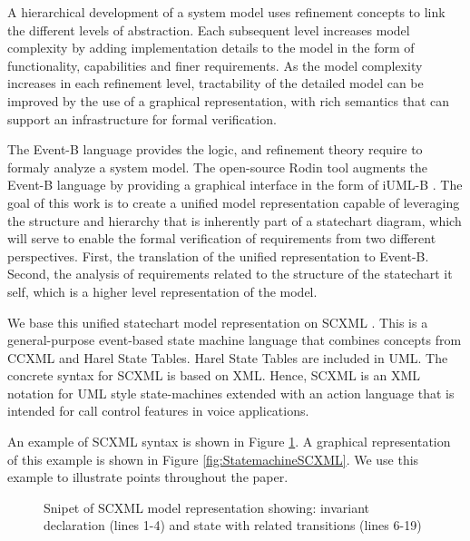 \documentclass{easychair}
\begin{document}
A hierarchical development of a system model uses 
refinement concepts to link the different levels
of abstraction. Each subsequent level increases model 
complexity by adding implementation details to the 
model in the form of functionality, capabilities and 
finer requirements. As the model complexity increases 
in each refinement level, tractability of the detailed 
model can be improved by the use of a graphical representation, 
with rich semantics that can support an infrastructure 
for formal verification.

The Event-B language \cite{abrial10:_model_event_b} provides the logic, and refinement
theory require to formaly analyze a system model. The 
open-source Rodin tool \cite{abrial10:_rodin} augments the Event-B language by 
providing a graphical interface in the form of
iUML-B \cite{snook14:_b_statem}. The goal of this work is to create a unified model 
representation capable of leveraging the structure and 
hierarchy that is inherently part of a statechart 
diagram, which will serve to enable the formal verification
of requirements from two different perspectives. First, 
the translation of the unified representation to Event-B. Second,
the analysis of requirements related to the structure of 
the statechart it self, which is a higher level representation 
of the model. 

We base this unified statechart model representation 
on SCXML  \cite{scxmlwebsite}.  This is a general-purpose event-based state machine 
language that combines concepts from CCXML and Harel 
State Tables. Harel State Tables are included in UML. 
The concrete syntax for SCXML
is based on XML. Hence, SCXML is an XML notation for 
UML style state-machines extended with an action 
language that is intended for call control features 
in voice applications.

An example of SCXML syntax is shown in Figure \ref{fig:scxml}. 
A graphical representation of this example is shown in Figure  \ref{fig:StatemachineSCXML}. 
We use this example to illustrate points throughout the paper.


% 


\begin{figure}[tbp!]
  \caption{Snipet of SCXML model representation showing: invariant declaration (lines 1-4) and state with related transitions (lines 6-19)} 
  \label{fig:scxml}
\end{figure}
\end{document}
